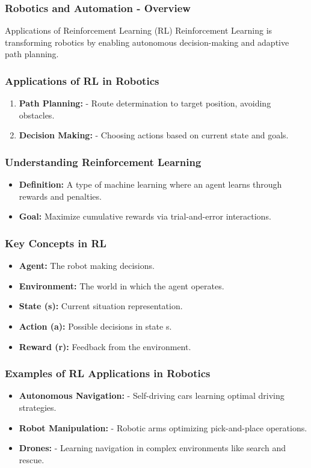 \documentclass[aspectratio=169]{beamer}
\begin{document}
\begin{frame}[fragile]
    \frametitle{Robotics and Automation - Overview}
    \begin{block}{Applications of Reinforcement Learning (RL)}
        Reinforcement Learning is transforming robotics by enabling autonomous decision-making and adaptive path planning.
    \end{block}
\end{frame}

\begin{frame}[fragile]
    \frametitle{Applications of RL in Robotics}
    \begin{enumerate}
        \item \textbf{Path Planning:} 
            - Route determination to target position, avoiding obstacles.
        \item \textbf{Decision Making:} 
            - Choosing actions based on current state and goals.
    \end{enumerate}
\end{frame}

\begin{frame}[fragile]
    \frametitle{Understanding Reinforcement Learning}
    \begin{itemize}
        \item \textbf{Definition:} 
            A type of machine learning where an agent learns through rewards and penalties.
        \item \textbf{Goal:} 
            Maximize cumulative rewards via trial-and-error interactions.
    \end{itemize}
\end{frame}

\begin{frame}[fragile]
    \frametitle{Key Concepts in RL}
    \begin{itemize}
        \item \textbf{Agent:} The robot making decisions.
        \item \textbf{Environment:} The world in which the agent operates.
        \item \textbf{State (s):} Current situation representation.
        \item \textbf{Action (a):} Possible decisions in state s.
        \item \textbf{Reward (r):} Feedback from the environment.
    \end{itemize}
\end{frame}

\begin{frame}[fragile]
    \frametitle{Examples of RL Applications in Robotics}
    \begin{itemize}
        \item \textbf{Autonomous Navigation:}
            - Self-driving cars learning optimal driving strategies.
        \item \textbf{Robot Manipulation:}
            - Robotic arms optimizing pick-and-place operations.
        \item \textbf{Drones:}
            - Learning navigation in complex environments like search and rescue.
    \end{itemize}
\end{frame}
\end{document}

